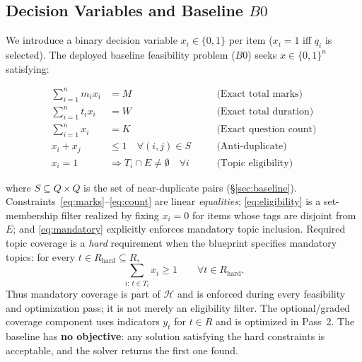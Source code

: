 \documentclass[runningheads]{llncs}
\begin{document}
\subsection{Decision Variables and Baseline $B0$}
We introduce a binary decision variable $x_i\in\{0,1\}$ per item ($x_i=1$ iff $q_i$ is selected).
The deployed baseline feasibility problem ($B0$) seeks $x\in\{0,1\}^n$ satisfying:

\begin{align}
\sum_{i=1}^n m_i x_i &= M \quad &&\text{(Exact total marks)} \label{eq:marks} \\
\sum_{i=1}^n t_i x_i &= W \quad &&\text{(Exact total duration)} \label{eq:time} \\
\sum_{i=1}^n x_i &= K \quad &&\text{(Exact question count)} \label{eq:count} \\
x_i + x_j &\le 1 \quad \forall (i,j)\in S \quad &&\text{(Anti-duplicate)} \label{eq:conflict} \\
x_i = 1 &\Rightarrow T_i\cap E\neq\emptyset \quad \forall i \quad &&\text{(Topic eligibility)} \label{eq:eligibility}
\end{align}

\noindent where $S\subseteq Q\times Q$ is the set of near-duplicate pairs (\S\ref{sec:baseline}).
Constraints~\eqref{eq:marks}--\eqref{eq:count} are linear \emph{equalities}; \eqref{eq:eligibility} is a set-membership filter realized by fixing $x_i=0$ for items whose tags are disjoint from $E$; and \eqref{eq:mandatory} explicitly enforces mandatory topic inclusion.
Required topic coverage is a \emph{hard} requirement when the blueprint specifies mandatory topics: for every $t\in R_{\mathrm{hard}}\subseteq R$,
\begin{equation}
\sum_{i:\,t\in T_i}x_i \ge 1 \qquad \forall t\in R_{\mathrm{hard}}.
\label{eq:mandatory}
\end{equation}
Thus mandatory coverage is part of $\mathcal{H}$ and is enforced during every feasibility and optimization pass; it is not merely an eligibility filter. The optional/graded coverage component uses indicators $y_t$ for $t\in R$ and is optimized in Pass~2. The baseline has \textbf{no objective}: any solution satisfying the hard constraints is acceptable, and the solver returns the first one found.
\end{document}
